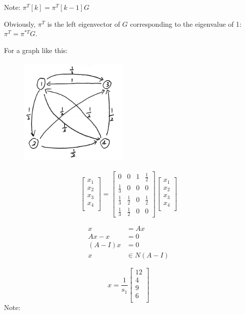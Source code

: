 Note: $\pi^T[k] = \pi^T[k - 1]G$

Obviously, $\pi^{T}$ is the left eigenvector of $G$ corresponding to the eigenvalue of 1: $\pi^{T} = \pi^{*T}G$.

For a graph like this:

\begin{figure}
	\centering
	\includegraphics[width=2.1in,height=2.1in]{figures/ch03/figure3.jpg}
\end{figure}



$$
\left[
\begin{matrix}
x_1 \\
x_2 \\
x_3\\
x_4\\
\end{matrix}
\right] =
\left[
\begin{matrix}
0 & 0 & 1 & \frac{1}{2} \\
\frac{1}{3} & 0 & 0& 0 \\
\frac{1}{3}& \frac{1}{2} & 0 & \frac{1}{2} \\
\frac{1}{3} & \frac{1}{2} & 0 & 0 
\end{matrix}
\right]
\left[
\begin{matrix}
x_1 \\
x_2 \\
x_3\\
x_4\\
\end{matrix}
\right]
$$

\begin{align*}
x &= Ax \\
Ax - x &= 0\\
(A - I)x &= 0\\
x&\in N(A-I)
\end{align*}


$$
x = \frac{1}{s_1}
\left[
\begin{matrix}
12 \\
4 \\
9\\
6\\
\end{matrix}
\right]
$$
Note: 

